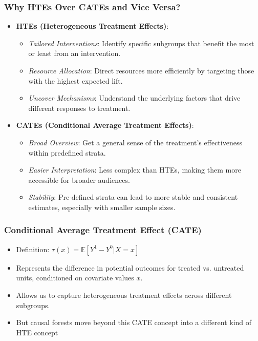\documentclass{beamer}
\begin{document}
\begin{frame}
\frametitle{Why HTEs Over CATEs and Vice Versa?}
\begin{itemize}
    \item \textbf{HTEs (Heterogeneous Treatment Effects)}:
    \begin{itemize}
        \item \textit{Tailored Interventions}: Identify specific subgroups that benefit the most or least from an intervention.
        \item \textit{Resource Allocation}: Direct resources more efficiently by targeting those with the highest expected lift.
        \item \textit{Uncover Mechanisms}: Understand the underlying factors that drive different responses to treatment.
    \end{itemize}
    \bigskip
    \item \textbf{CATEs (Conditional Average Treatment Effects)}:
    \begin{itemize}
        \item \textit{Broad Overview}: Get a general sense of the treatment's effectiveness within predefined strata.
        \item \textit{Easier Interpretation}: Less complex than HTEs, making them more accessible for broader audiences.
        \item \textit{Stability}: Pre-defined strata can lead to more stable and consistent estimates, especially with smaller sample sizes.
    \end{itemize}
\end{itemize}
\end{frame}


\begin{frame}
\frametitle{Conditional Average Treatment Effect (CATE)}
\begin{itemize}
    \item Definition: \( \tau(x) = \mathbb{E}[Y^1 - Y^0 | X = x] \)
    \item Represents the difference in potential outcomes for treated vs. untreated units, conditioned on covariate values \(x\).
    \item Allows us to capture heterogeneous treatment effects across different subgroups.
	\item But causal forests move beyond this CATE concept into a different kind of HTE concept
\end{itemize}
\end{frame}
\end{document}
